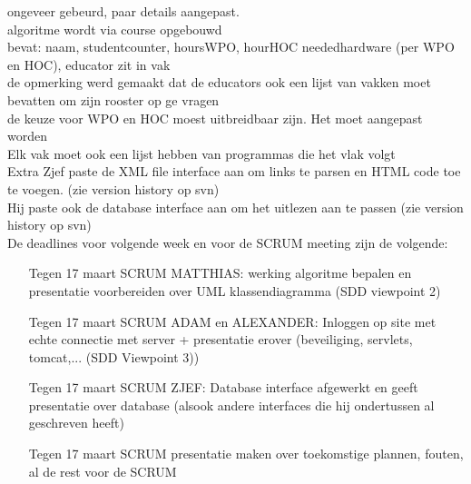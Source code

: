 \documentclass{article}
\begin{document}
 ongeveer gebeurd, paar details aangepast. \\
algoritme wordt via course opgebouwd \\
bevat: naam, studentcounter, hoursWPO, hourHOC neededhardware (per WPO en HOC), educator zit in vak \\
de opmerking werd gemaakt dat de educators ook een lijst van vakken moet bevatten om zijn rooster op ge vragen \\
de keuze voor WPO en HOC moest uitbreidbaar zijn. Het moet aangepast worden \\
Elk vak moet ook een lijst hebben van programmas die het vlak volgt \\
Extra Zjef paste de XML file interface aan om links te parsen en HTML code toe te voegen. (zie version history op svn) \\
Hij paste ook de database interface aan om het uitlezen aan te passen (zie version history op svn) \\[3mm]

De deadlines voor volgende week en voor de SCRUM meeting zijn de volgende: 
\begin{itemize}
	\item[Tegen 17 maart] SCRUM MATTHIAS: werking algoritme bepalen en presentatie voorbereiden over UML klassendiagramma (SDD viewpoint 2) 
	\item[Tegen 17 maart] SCRUM ADAM en ALEXANDER: Inloggen op site met echte connectie met server + presentatie erover (beveiliging, servlets, tomcat,... (SDD Viewpoint 3))
	\item[Tegen 17 maart] SCRUM ZJEF: Database interface afgewerkt en geeft presentatie over database (alsook andere interfaces die hij ondertussen al geschreven heeft)
	\item[Tegen 17 maart] SCRUM presentatie maken over toekomstige plannen, fouten, al de rest voor de SCRUM 
\end{itemize}
\end{document}
